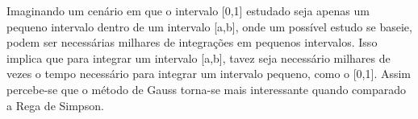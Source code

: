 \documentclass[12pt,a4paper]{article}
\begin{document}
\qquad Imaginando um cenário em que o intervalo [0,1] estudado seja apenas um pequeno intervalo dentro de um intervalo [a,b], onde um possível estudo se baseie, podem ser necessárias milhares de integrações em pequenos intervalos. Isso implica que para integrar um intervalo [a,b], tavez seja necessário milhares de vezes o tempo necessário para integrar um intervalo pequeno, como o [0,1]. Assim percebe-se que o método de Gauss torna-se mais interessante quando comparado a Rega de Simpson.
\newpage
\end{document}
